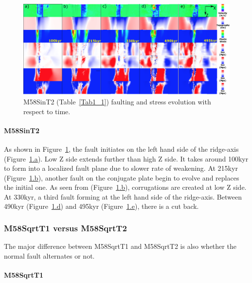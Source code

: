 \begin{figure}[h]
 \centering
  \includegraphics[width=1.0\textwidth]{fig_Results_Weakening_6_M58SinT2_time_evolution.eps}
 \caption{M58SinT2 (Table~\hyperref[Tab1_1]{\ref{Tab1_1}}) faulting and stress evolution with respect to time.}
\label{fig_Results_Weakenging_6}
\end{figure}

\paragraph{M58SinT2}\label{para_M58SinT2}

As shown in Figure~\hyperref[fig_Results_Weakenging_6]{\ref{fig_Results_Weakenging_6}}, the fault initiates on the left hand side of the ridge-axis (Figure~\hyperref[fig_Results_Weakenging_6]{\ref{fig_Results_Weakenging_6}.a}). Low Z side extends further than high Z side. It takes around 100kyr to form into a localized fault plane due to slower rate of weakening. At 215kyr (Figure~\hyperref[fig_Results_Weakenging_6]{\ref{fig_Results_Weakenging_6}.b}), another fault on the conjugate plate begin to evolve and replaces the initial one. As seen from (Figure~\hyperref[fig_Results_Weakenging_6]{\ref{fig_Results_Weakenging_6}.b}), corrugations are created at low Z side. At 330kyr, a third fault forming at the left hand side of the ridge-axis. Between 490kyr (Figure~\hyperref[fig_Results_Weakenging_6]{\ref{fig_Results_Weakenging_6}.d}) and 495kyr (Figure~\hyperref[fig_Results_Weakenging_6]{\ref{fig_Results_Weakenging_6}.e}), there is a cut back.

\subsubsection{M58SqrtT1 versus M58SqrtT2}
The major difference between M58SqrtT1 and M58SqrtT2 is also whether the normal fault alternates or not.

\paragraph{M58SqrtT1}\label{para_M58SqrtT1}

